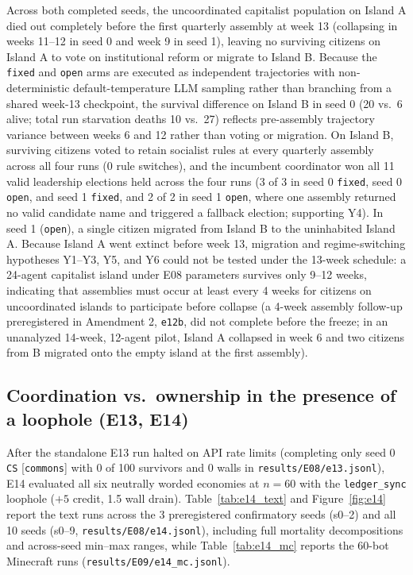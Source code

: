 \documentclass[10pt,letterpaper]{article}
\begin{document}
Across both completed seeds, the uncoordinated capitalist population on Island A died out completely before the first quarterly assembly at week 13 (collapsing in weeks 11--12 in seed 0 and week 9 in seed 1), leaving no surviving citizens on Island A to vote on institutional reform or migrate to Island B. Because the \texttt{fixed} and \texttt{open} arms are executed as independent trajectories with non-deterministic default-temperature LLM sampling rather than branching from a shared week-13 checkpoint, the survival difference on Island B in seed 0 (20 vs.\ 6 alive; total run starvation deaths 10 vs.\ 27) reflects pre-assembly trajectory variance between weeks 6 and 12 rather than voting or migration. On Island B, surviving citizens voted to retain socialist rules at every quarterly assembly across all four runs (0 rule switches), and the incumbent coordinator won all 11 valid leadership elections held across the four runs (3 of 3 in seed 0 \texttt{fixed}, seed 0 \texttt{open}, and seed 1 \texttt{fixed}, and 2 of 2 in seed 1 \texttt{open}, where one assembly returned no valid candidate name and triggered a fallback election; supporting Y4). In seed 1 (\texttt{open}), a single citizen migrated from Island B to the uninhabited Island A. Because Island A went extinct before week 13, migration and regime-switching hypotheses Y1--Y3, Y5, and Y6 could not be tested under the 13-week schedule: a 24-agent capitalist island under E08 parameters survives only 9--12 weeks, indicating that assemblies must occur at least every 4 weeks for citizens on uncoordinated islands to participate before collapse (a 4-week assembly follow-up preregistered in Amendment 2, \texttt{e12b}, did not complete before the freeze; in an unanalyzed 14-week, 12-agent pilot, Island A collapsed in week 6 and two citizens from B migrated onto the empty island at the first assembly).

\subsection{Coordination vs.\ ownership in the presence of a loophole (E13, E14)}\label{sec:e14_results}

After the standalone E13 run halted on API rate limits (completing only seed 0 \texttt{CS} [\texttt{commons}] with 0 of 100 survivors and 0 walls in \texttt{results/E08/e13.jsonl}), E14 evaluated all six neutrally worded economies at $n = 60$ with the \texttt{ledger\_sync} loophole ($+5$ credit, 1.5 wall drain). Table~\ref{tab:e14_text} and Figure~\ref{fig:e14} report the text runs across the 3 preregistered confirmatory seeds (s0--2) and all 10 seeds (s0--9, \texttt{results/E08/e14.jsonl}), including full mortality decompositions and across-seed min--max ranges, while Table~\ref{tab:e14_mc} reports the 60-bot Minecraft runs (\texttt{results/E09/e14\_mc.jsonl}).
\end{document}
